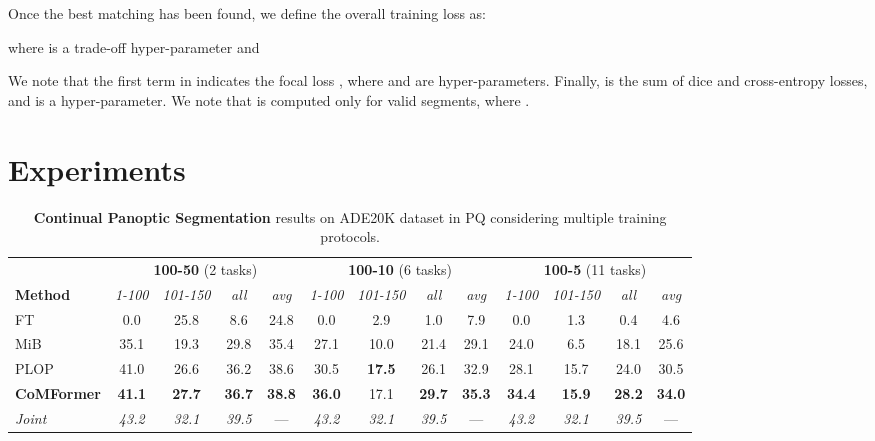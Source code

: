 \documentclass[10pt,twocolumn,letterpaper]{article}
\begin{document}
Once the best matching  has been found, we define the overall training loss as:

where  is a trade-off hyper-parameter and

We note that the first term in  indicates the focal loss \cite{lin2017focalloss}, where  and  are hyper-parameters.
Finally,  is the sum of dice and cross-entropy losses, and  is a hyper-parameter. We note that  is computed only for valid segments, \ie where . 
\section{Experiments}
\label{sec:exp}


\begin{table*}[t]
\centering
\small
\begin{tabular}{l|cccc|cccc|cccc}
\hline
\multicolumn{1}{c}{} & \multicolumn{4}{c}{{\textbf{100-50} (2 tasks)}}  & \multicolumn{4}{c}{{\textbf{100-10} (6 tasks)}} & \multicolumn{4}{c}{{\textbf{100-5} (11 tasks)}} \\
\textbf{Method}       & \textit{1-100} & \textit{101-150} & \textit{all} & \textit{avg} & \textit{1-100} & \textit{101-150}  & \textit{all} & \textit{avg}  & \textit{1-100} & \textit{101-150} & \textit{all} & \textit{avg}  \\ \hline
FT           &  0.0 & 25.8  & 8.6 & 24.8	&  0.0 &   2.9  &  1.0 & 7.9 &  0.0	&  1.3 	& 0.4 &  4.6  \\ 
MiB          & 35.1 & 19.3  &29.8 & 35.4	& 27.1 &  10.0  & 21.4 & 29.1 & 24.0	&  6.5  &	18.1& 25.6  \\ 
PLOP         & 41.0 & 26.6 &  36.2 & 38.6	& 30.5 &  \textbf{17.5} & 26.1 & 32.9  & 28.1	& 15.7  &	24.0& 30.5  \\ 
\textbf{CoMFormer}    & \textbf{41.1} & \textbf{27.7} & \textbf{36.7} & \textbf{38.8} &\textbf{36.0} &  17.1  & \textbf{29.7}& \textbf{35.3} & \textbf{34.4}	& \textbf{15.9}  &	\textbf{28.2}& \textbf{34.0} \\ \hdashline
\textit{Joint}        & \textit{43.2} & \textit{32.1}  & \textit{39.5} & ---  & \textit{43.2} &  \textit{32.1}   & \textit{39.5} & ---  & \textit{43.2}	& \textit{32.1}   &	\textit{39.5} & --- \\ 
\hline
\end{tabular}
\caption{\textbf{Continual Panoptic Segmentation} results on ADE20K dataset in PQ considering multiple training protocols.}
\label{tab:ade_pan}

\end{table*}
 
\end{document}
